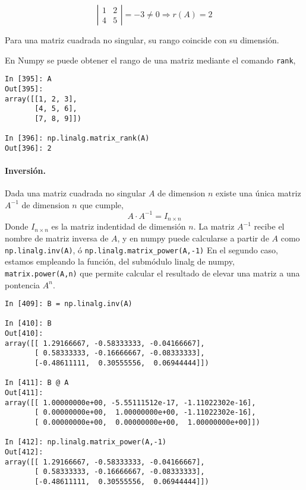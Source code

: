 \begin{equation*}
\left \vert \begin{matrix}
1& 2\\
4& 5
\end{matrix} \right \vert=-3 \neq 0 \Rightarrow r(A)=2
\end{equation*}
\begin{paracol}{2}
Para una matriz cuadrada no singular, su rango coincide con su dimensión.

En Numpy se puede obtener el rango de una  matriz mediante el comando \texttt{rank},
\end{paracol}
\begin{center}
\begin{minipage}{0.5\textwidth}
\begin{verbatim}
In [395]: A
Out[395]: 
array([[1, 2, 3],
       [4, 5, 6],
       [7, 8, 9]])

In [396]: np.linalg.matrix_rank(A)
Out[396]: 2
\end{verbatim}
\end{minipage}
\end{center}
\begin{paracol}{2}
\paragraph{Inversión.} Dada una matriz cuadrada no singular $A$ de dimension $n$ existe una única matriz $A^{-1}$ de dimension $n$ que cumple,
\begin{equation*}
A\cdot A^{-1}=I_{n\times n}
\end{equation*}
Donde $I_{n\times n}$ es la matriz indentidad de dimensión $n$.
La matriz $A^{-1}$ recibe el nombre de matriz inversa de $A$, y  en numpy puede calcularse a partir de $A$ como \texttt{np.linalg.inv(A)}, ó \texttt{np.linalg.matrix_power(A,-1)}
En el segundo caso, estamos empleando la función, del submódulo linalg de numpy, \texttt{matrix.power(A,n)} que permite calcular el resultado de elevar una matriz a una pontencia $A^n$.
\end{paracol}
\begin{center}
\begin{minipage}{0.7\textwidth}
\begin{verbatim}
In [409]: B = np.linalg.inv(A)

In [410]: B
Out[410]: 
array([[ 1.29166667, -0.58333333, -0.04166667],
       [ 0.58333333, -0.16666667, -0.08333333],
       [-0.48611111,  0.30555556,  0.06944444]])

In [411]: B @ A
Out[411]: 
array([[ 1.00000000e+00, -5.55111512e-17, -1.11022302e-16],
       [ 0.00000000e+00,  1.00000000e+00, -1.11022302e-16],
       [ 0.00000000e+00,  0.00000000e+00,  1.00000000e+00]])

In [412]: np.linalg.matrix_power(A,-1)
Out[412]: 
array([[ 1.29166667, -0.58333333, -0.04166667],
       [ 0.58333333, -0.16666667, -0.08333333],
       [-0.48611111,  0.30555556,  0.06944444]])
\end{verbatim}
\end{minipage}
\end{center}
